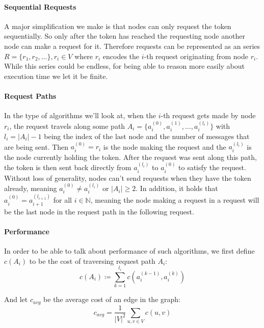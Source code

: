 \documentclass[a4paper, oneside]{discothesis}
\begin{document}
\paragraph{Sequential Requests} A major simplification we make is that nodes can only request the token sequentially. So only after the token has reached the requesting node another node can make a request for it. Therefore requests can be represented as an series $R=\{r_1,r_2,\dots\},r_i\in V$ where $r_i$ encodes the $i$-th request originating from node $r_i$. While this series could be endless, for being able to reason more easily about execution time we let it be finite.

\paragraph{Request Paths} In the type of algorithms we'll look at, when the $i$-th request gets made by node $r_i$, the request travels along some path $A_i=\{a_i^{(0)},a_i^{(1)},\dots,a_i^{(l_i)}\}$ with $l_i=|A_i|-1$ being the index of the last node and the number of messages that are being sent. Then $a_i^{(0)}=r_i$ is the node making the request and the $a_i^{(l_i)}$ is the node currently holding the token. After the request was sent along this path, the token is then sent back directly from $a_i^{(l_i)}$ to $a_i^{(0)}$ to satisfy the request. Without loss of generality, nodes can't send requests when they have the token already, meaning $a_i^{(0)}\neq a_i^{(l_i)}$ or $|A_i|\geq 2$. In addition, it holds that $a_i^{(0)}=a_{i+1}^{(l_{i+1})}$ for all $i\in\mathbb{N}$, meaning the node making a request in a request will be the last node in the request path in the following request.

\paragraph{Performance} In order to be able to talk about performance of such algorithms, we first define $c(A_i)$ to be the cost of traversing request path $A_i$:
\begin{equation}
c(A_i)\coloneqq\sum_{k=1}^{l_i}c(a_i^{(k-1)}, a_i^{(k)})
\end{equation}

And let $c_{avg}$ be the average cost of an edge in the graph:
\begin{equation}
c_{avg}=\frac{1}{|V|^2}\sum_{u,v\in V}c(u,v)
\end{equation}
\end{document}
